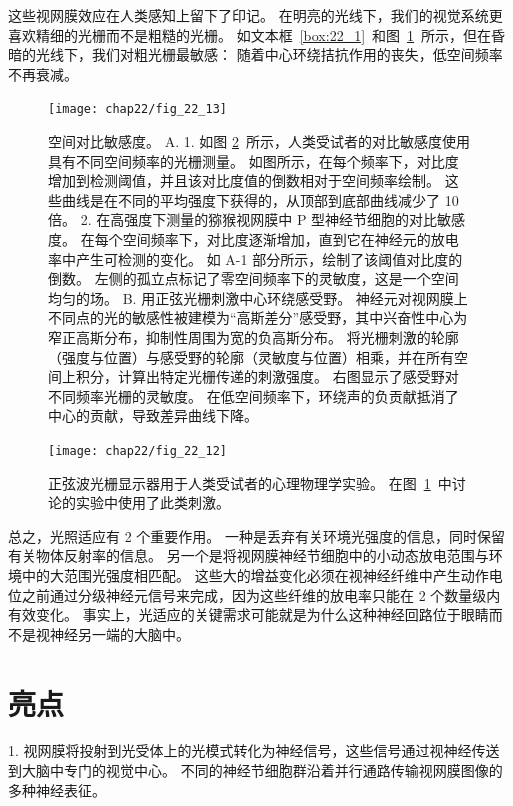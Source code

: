 这些视网膜效应在人类感知上留下了印记。
在明亮的光线下，我们的视觉系统更喜欢精细的光栅而不是粗糙的光栅。
如文本框~\ref{box:22_1}~和图~\ref{fig:22_13}~所示，但在昏暗的光线下，我们对粗光栅最敏感：
随着中心环绕拮抗作用的丧失，低空间频率不再衰减。


\begin{figure}[htbp]
	\centering
	\texttt{[image: chap22/fig\_22\_13]}
	\caption{空间对比敏感度。
		A. 1. 如图 \ref{fig:22_12}~所示，人类受试者的对比敏感度使用具有不同空间频率的光栅测量。
		如图所示，在每个频率下，对比度增加到检测阈值，并且该对比度值的倒数相对于空间频率绘制。
		这些曲线是在不同的平均强度下获得的，从顶部到底部曲线减少了 10 倍\cite{de1974psychophysical}。
		2. 在高强度下测量的猕猴视网膜中 P 型神经节细胞的对比敏感度。 
		在每个空间频率下，对比度逐渐增加，直到它在神经元的放电率中产生可检测的变化。
		如 A-1 部分所示，绘制了该阈值对比度的倒数。 
		左侧的孤立点标记了零空间频率下的灵敏度，这是一个空间均匀的场\cite{derrington1984spatial}。
		B. 用正弦光栅刺激中心环绕感受野。
		神经元对视网膜上不同点的光的敏感性被建模为“高斯差分”感受野，其中兴奋性中心为窄正高斯分布，抑制性周围为宽的负高斯分布。
		将光栅刺激的轮廓（强度与位置）与感受野的轮廓（灵敏度与位置）相乘，并在所有空间上积分，计算出特定光栅传递的刺激强度。
		右图显示了感受野对不同频率光栅的灵敏度。
		在低空间频率下，环绕声的负贡献抵消了中心的贡献，导致差异曲线下降\cite{enroth1984functional}。}
	\label{fig:22_13}
\end{figure}


\begin{figure}[htbp]
	\centering
	\texttt{[image: chap22/fig\_22\_12]}
	\caption{正弦波光栅显示器用于人类受试者的心理物理学实验。
		在图~\ref{fig:22_13}~中讨论的实验中使用了此类刺激。}
	\label{fig:22_12}
\end{figure}


总之，光照适应有 2 个重要作用。
一种是丢弃有关环境光强度的信息，同时保留有关物体反射率的信息。
另一个是将视网膜神经节细胞中的小动态放电范围与环境中的大范围光强度相匹配。
这些大的增益变化必须在视神经纤维中产生动作电位之前通过分级神经元信号来完成，因为这些纤维的放电率只能在 2 个数量级内有效变化。
事实上，光适应的关键需求可能就是为什么这种神经回路位于眼睛而不是视神经另一端的大脑中。



\section{亮点}

1. 视网膜将投射到光受体上的光模式转化为神经信号，这些信号通过视神经传送到大脑中专门的视觉中心。 
不同的神经节细胞群沿着并行通路传输视网膜图像的多种神经表征。


